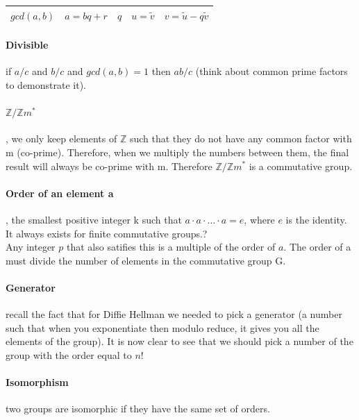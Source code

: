 \documentclass{article}
\begin{document}
\begin{table}[h]
    \centering
    \begin{tabular}{|c|c|c|c|c|}
        \hline
        $ gcd(a,b) $ & $a = bq + r$ & $q$ & $u = \tilde{v}$ & $v = \tilde{u} - q\tilde{v} $ \\
        \hline
    \end{tabular}
    \label{tab:my_label}
\end{table}

\paragraph{Divisible} if $a/c$ and $b/c$ and $gcd(a, b) = 1$ then $ab/c$ (think about common prime factors to demonstrate it).

\paragraph{$\mathbb{Z}/\mathbb{Z}m^*$}, we only keep elements of $ \mathbb{Z} $ such that they do not have any common factor with m (co-prime). Therefore, when we multiply the numbers between them, the final result will always be co-prime with m. Therefore $\mathbb{Z}/\mathbb{Z}m^*$ is a commutative group.

\paragraph{Order of an element a}, the smallest positive integer k such that $ a \cdot a \cdot ... \cdot a  = e $, where $ e $ is the identity. It always exists for finite commutative groups.?\\
Any integer $p$ that also satifies this is a multiple of the order of $a$. The order of a must divide the number of elements in the commutative group G.

\paragraph{Generator} recall the fact that for Diffie Hellman we needed to pick a generator (a number such that when you exponentiate then modulo reduce, it gives you all the elements of the group). It is now clear to see that we should pick a number of the group with the order equal to $n$!

\paragraph{Isomorphism} two groups are isomorphic if they have the same set of orders.
\end{document}
